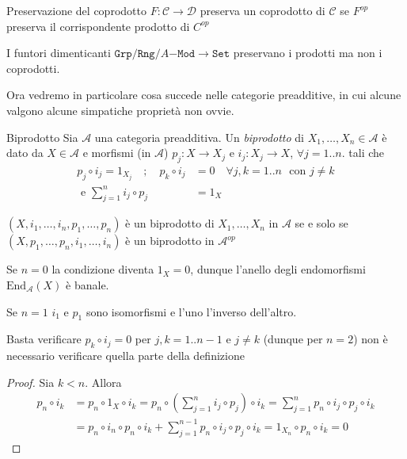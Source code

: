 \begin{definition}{Preservazione del coprodotto}
    \(F: \mathcal{C} \to \mathcal{D}\) preserva un coprodotto di \(\mathcal{C}\) se \(F^{op}\) preserva il
    corrispondente prodotto di \(C^{op}\) 
\end{definition}

\begin{example}{}
    I funtori dimenticanti \(\mathtt{Grp}/\mathtt{Rng}/A\mathtt{-Mod} \to \mathtt{Set}\) preservano i prodotti ma non i coprodotti.
\end{example}

Ora vedremo in particolare cosa succede nelle categorie preadditive, in cui
alcune valgono alcune simpatiche proprietà non ovvie.

\begin{definition}{Biprodotto}
    Sia \(\mathcal{A}\) una categoria preadditiva. Un \emph{biprodotto} di \(X_{1}, \dots, X_{n} \in \mathcal{A}\) 
    è dato da \(X \in \mathcal{A}\) e morfismi (in \(\mathcal{A}\)) \(p_{j}: X\to X_j\) e \(i_{j}:
    X_j \to X\), \(\forall j=1.. n\).
    tali che
    \begin{align*}
        p_{j}\circ i_{j} = 1_{X_{j}} \quad ; \quad p_k \circ i_{j} &= 0 \quad \forall j,k=1 .. n \,\, \text{ con }j \neq k \\
        \text{ e }\sum_{j=1}^{n} i_{j} \circ p_j &= 1_X 
    \end{align*}
\end{definition}
\begin{remark}{}
    \({(X, i_{1}, \dots, i_n, p_{1}, \dots, p_n )}\) è un biprodotto di \(X_{1}, \dots, X_{n}\) in \(\mathcal{A}\) 
    se e solo se \({(X, p_{1}, \dots, p_n, i_1, \dots, i_n)}\) è un biprodotto
    in \(\mathcal{A}^{op}\) 
\end{remark}
Se \(n = 0\) la condizione diventa \(1_X = 0\), dunque l'anello degli
endomorfismi \(\mathrm{End}_{\mathcal{A}} {(X)}\) è banale.

Se \(n = 1\) \(i_{1}\) e \(p_{1}\) sono isomorfismi e l'uno l'inverso
dell'altro.

\begin{remark}{}
Basta verificare \(p_k \circ i_{j} = 0\) per \(j,k=1. .n-1\) e \(j\neq k\)
(dunque per \(n=2\)) non è necessario verificare quella parte della definizione
\end{remark}
\begin{proof}{}
    Sia \(k < n\). Allora
    \begin{align*}
        p_n \circ i_k &= p_n \circ 1_X \circ i_k = p_n \circ {\left( \sum_{j=1}^{n} i_j \circ p_j  \right)} \circ i_k = \sum_{j=1}^{n} p_n \circ i_j \circ p_j \circ i_k \\
        &= p_n \circ i_n \circ p_n \circ i_k + \sum_{j=1}^{n-1} p_n \circ i_j
        \circ p_j \circ i_k = 1_{X_{n}} \circ p_n \circ i_k = 0
    \end{align*}
\end{proof}

